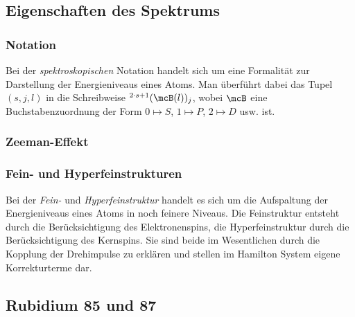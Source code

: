 \documentclass[../main.tex]{subfiles}
\begin{document}
    \subsection{Eigenschaften des Spektrums}
        \subsubsection*{Notation}
            Bei der \emph{spektroskopischen} Notation handelt sich um eine Formalität zur Darstellung der Energieniveaus eines Atoms. Man überführt dabei das Tupel $(s,j,l)$ in die Schreibweise $^{2\cdot s + 1}(\mcB(l))_j$, wobei $\mcB$ eine Buchstabenzuordnung der Form $0\mapsto S$, $1\mapsto P$, $2\mapsto D$ usw. ist. 

        \subsubsection*{Zeeman-Effekt}


			

        \subsubsection*{Fein- und Hyperfeinstrukturen}
            Bei der \emph{Fein-} und \emph{Hyperfeinstruktur} handelt es sich um die Aufspaltung der Energieniveaus eines Atoms in noch feinere Niveaus. Die Feinstruktur entsteht durch die Berücksichtigung des Elektronenspins, die Hyperfeinstruktur durch die Berücksichtigung des Kernspins. Sie sind beide im Wesentlichen durch die Kopplung der Drehimpulse zu erklären und stellen im Hamilton System eigene Korrekturterme dar. 

    \subsection{Rubidium 85 und 87}
        
\end{document}
